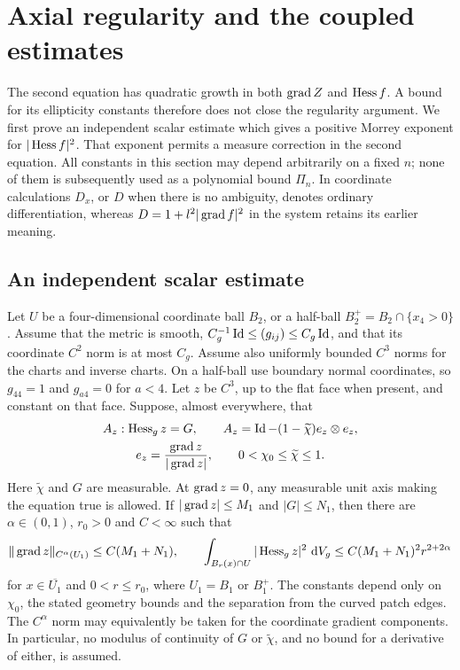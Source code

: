 \section{Axial regularity and the coupled estimates}\label{four:sec:regularity}

The second equation has quadratic growth in both $\operatorname{grad} Z$ and
$\operatorname{Hess} f$.  A bound for its ellipticity constants therefore does not
close the regularity argument.  We first prove an independent scalar
estimate which gives a positive Morrey exponent for $|\operatorname{Hess} f|^2$.
That exponent permits a measure correction in the second equation.
All constants in this section may depend arbitrarily on a fixed $n$;
none of them is subsequently used as a polynomial bound $\Pi_n$.
In coordinate calculations $D_x$, or $D$ when there is no ambiguity,
denotes ordinary differentiation, whereas $D=1+l^2|\operatorname{grad} f|^2$ in
the system retains its earlier meaning.

\subsection{An independent scalar estimate}

\begin{theorem}\label{four:thm:axial-regularity}
Let $U$ be a four-dimensional coordinate ball $B_2$, or a half-ball
$B_2^+=B_2\cap\{x_4>0\}$.  Assume that the metric is smooth,
$C_g^{-1}\operatorname{Id}\le (g_{ij})\le C_g\operatorname{Id}$, and that its coordinate
$C^2$ norm is at most $C_g$.  Assume also uniformly bounded $C^3$
norms for the charts and inverse charts.  On a half-ball use boundary
normal coordinates, so $g_{44}=1$ and $g_{a4}=0$ for $a<4$.
Let $z$ be $C^3$, up to the flat face when present, and constant on
that face.  Suppose, almost everywhere, that
\begin{equation}\label{four:reg:axial-equation}
 \begin{gathered}
 A_z:\operatorname{Hess}_g z=G,\qquad
 A_z=\operatorname{Id}-(1-\widetilde\chi)e_z\otimes e_z,\\
 e_z=\frac{\operatorname{grad} z}{|\operatorname{grad} z|},\qquad
 0<\chi_0\le\widetilde\chi\le1.
 \end{gathered}
\end{equation}
Here $\widetilde\chi$ and $G$ are measurable.  At $\operatorname{grad} z=0$,
any measurable unit axis making the equation true is allowed.
If $|\operatorname{grad} z|\le M_1$ and $|G|\le N_1$, then there are
$\alpha\in(0,1)$, $r_0>0$ and $C<\infty$ such that
\begin{equation}\label{four:eq:axial-estimate}
 \|\operatorname{grad} z\|_{C^\alpha(U_1)}\le C(M_1+N_1),\qquad
 \int_{B_r(x)\cap U}|\operatorname{Hess}_g z|^2\,\,\mathrm d V_g
       \le C(M_1+N_1)^2r^{2+2\alpha}
\end{equation}
for $x\in\overline{U_1}$ and $0<r\le r_0$, where $U_1=B_1$
or $B_1^+$.  The constants depend only on $\chi_0$, the stated
geometry bounds and the separation from the curved patch edges.
The $C^\alpha$ norm may equivalently be taken for the coordinate
gradient components.  In particular, no modulus of continuity of
$G$ or $\widetilde\chi$, and no bound for a derivative of either,
is assumed.
\end{theorem}

